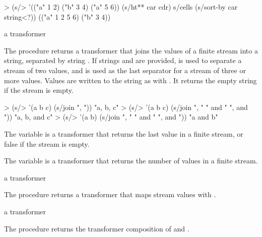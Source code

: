 \codebegin
> (s/> '(("a" 1 2) ("b" 3 4) ("a" 5 6))
    (s/ht** car cdr)
    s/cells
    (s/sort-by car string<?))
(("a" 1 2 5 6) ("b" 3 4))
\codeend

\begin{procedure}
\end{procedure}
\returns{} a transformer

The  procedure returns a transformer that joins the values of a finite stream
into a string, separated by string . If strings  and 
are provided,  is used to separate a stream of two values, and 
is used as the last separator for a stream of three or more values.  Values are written to
the string as with . It returns the empty string if the stream is empty.

\codebegin
> (s/> '(a b c) (s/join ", "))
"a, b, c"
> (s/> '(a b c) (s/join ", " " and " ", and "))
"a, b, and c"
> (s/> '(a b) (s/join ", " " and " ", and "))
"a and b"
\codeend

\begin{variable}
\end{variable}
\antipar

The  variable is a transformer that returns the last value in a finite stream,
or false if the stream is empty.

\begin{variable}
\end{variable}
\antipar

The  variable is a transformer that returns the number of values in a
finite stream.

\begin{procedure}
\end{procedure}
\returns{} a transformer

The  procedure returns a transformer that maps stream values with
.

\begin{procedure}
\end{procedure}
\returns{} a transformer

The  procedure returns the transformer composition of  and .


